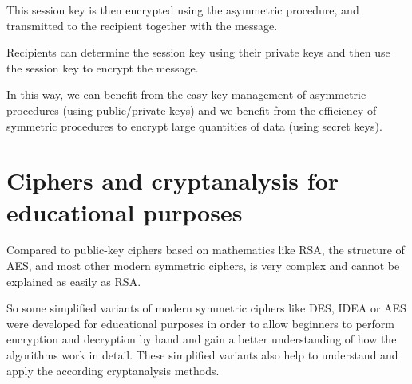 This session key is then encrypted using the asymmetric procedure, and
transmitted to the recipient together with the message.

Recipients can determine the session key using their private keys and
then use the session key to encrypt the message.

In this way, we can benefit from the easy key management
of asymmetric procedures (using public/private keys) and we benefit from the
efficiency of symmetric procedures to encrypt large quantities of data
(using secret keys).



\newpage
\begin{center}
\end{center}
\addtocounter{footnote}{0}
\section{Ciphers and cryptanalysis for educational purposes} 

Compared to public-key ciphers based on mathematics like RSA, the structure of AES,
and most other modern symmetric ciphers, is very complex and cannot be explained
as easily as RSA.

So some simplified variants of modern symmetric ciphers like DES, IDEA or AES
were developed for educational purposes in order to allow beginners to perform
encryption and decryption by hand and gain a better understanding of how the
algorithms work in detail.
These simplified variants also help to understand and apply the according
cryptanalysis methods.

